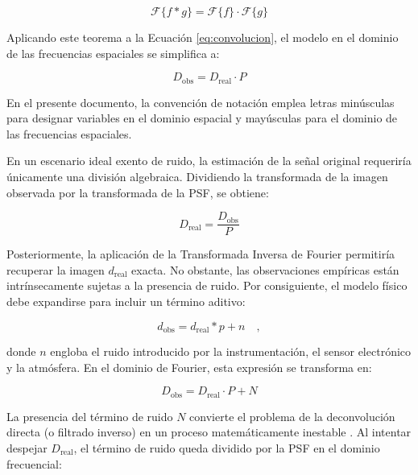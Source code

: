 \begin{equation}
    \label{eq:teoremaConvolucion}
    \mathcal{F}\{f * g\} = \mathcal{F}\{f\} \cdot \mathcal{F}\{g\}
\end{equation}

Aplicando este teorema a la Ecuación \ref{eq:convolucion}, el modelo en el dominio de las frecuencias espaciales se simplifica a:

\begin{equation}
    \label{eq:convolucionFourier}
    D_{\text{obs}} = D_{\text{real}} \cdot P
\end{equation}

En el presente documento, la convención de notación emplea letras minúsculas para designar variables en el dominio espacial y mayúsculas para el dominio de las frecuencias espaciales.

En un escenario ideal exento de ruido, la estimación de la señal original requeriría únicamente una división algebraica. Dividiendo la transformada de la imagen observada por la transformada de la PSF, se obtiene:

\begin{equation}
    \label{eq:deconvolucionIdeal}
    D_{\text{real}} = \frac{D_{\text{obs}}}{P}
\end{equation}

Posteriormente, la aplicación de la Transformada Inversa de Fourier permitiría recuperar la imagen $d_{\text{real}}$ exacta. No obstante, las observaciones empíricas están intrínsecamente sujetas a la presencia de ruido. Por consiguiente, el modelo físico debe expandirse para incluir un término aditivo:

\begin{equation}
    \label{eq:convolucionRuido}
    d_{\text{obs}} = d_{\text{real}} * p + n \quad,
\end{equation}

donde $n$ engloba el ruido introducido por la instrumentación, el sensor electrónico y la atmósfera. En el dominio de Fourier, esta expresión se transforma en:

\begin{equation}
    \label{eq:convolucionFourierRuido}
    D_{\text{obs}} = D_{\text{real}} \cdot P + N
\end{equation}

La presencia del término de ruido $N$ convierte el problema de la deconvolución directa (o filtrado inverso) en un proceso matemáticamente inestable \cite{Hunt1973}. Al intentar despejar $D_{\text{real}}$, el término de ruido queda dividido por la PSF en el dominio frecuencial:

